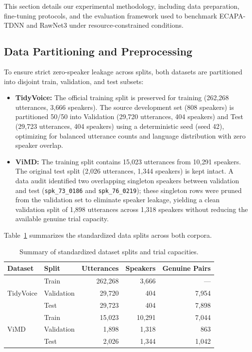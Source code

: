 This section details our experimental methodology, including data preparation, fine-tuning protocols, and the evaluation framework used to benchmark ECAPA-TDNN and RawNet3 under resource-constrained conditions.

\subsection{Data Partitioning and Preprocessing}

To ensure strict zero-speaker leakage across splits, both datasets are partitioned into disjoint train, validation, and test subsets:

\begin{itemize}
    \item \textbf{TidyVoice:} The official training split is preserved for training (262{,}268 utterances, 3{,}666 speakers). The source development set (808 speakers) is partitioned 50/50 into Validation (29{,}720 utterances, 404 speakers) and Test (29{,}723 utterances, 404 speakers) using a deterministic seed (seed 42), optimizing for balanced utterance counts and language distribution with zero speaker overlap.
    \item \textbf{ViMD:} The training split contains 15{,}023 utterances from 10{,}291 speakers. The original test split (2{,}026 utterances, 1{,}344 speakers) is kept intact. A data audit identified two overlapping singleton speakers between validation and test (\texttt{spk\_73\_0186} and \texttt{spk\_76\_0219}); these singleton rows were pruned from the validation set to eliminate speaker leakage, yielding a clean validation split of 1{,}898 utterances across 1{,}318 speakers without reducing the available genuine trial capacity.
\end{itemize}

Table~\ref{tab:dataset-splits} summarizes the standardized data splits across both corpora.

\begin{table}[H]
\centering
\begin{tabular}{llrrr}
\toprule
\textbf{Dataset} & \textbf{Split} & \textbf{Utterances} & \textbf{Speakers} & \textbf{Genuine Pairs} \\
\midrule
\multirow{3}{*}{TidyVoice} 
  & Train      & 262{,}268 & 3{,}666 & ---   \\
  & Validation & 29{,}720  & 404     & 7{,}954 \\
  & Test       & 29{,}723  & 404     & 7{,}898 \\
\midrule
\multirow{3}{*}{ViMD} 
  & Train      & 15{,}023  & 10{,}291 & 7{,}044 \\
  & Validation & 1{,}898   & 1{,}318  & 863     \\
  & Test       & 2{,}026   & 1{,}344  & 1{,}042 \\
\bottomrule
\end{tabular}
\caption{Summary of standardized dataset splits and trial capacities.}
\label{tab:dataset-splits}
\end{table}

